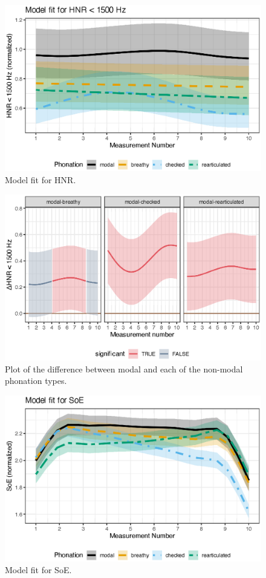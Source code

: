 \begin{figure}[h!]
    \centering
    \includegraphics[]{images/LCH_GAMMs/hnr15_model_fit.eps}
    \caption{Model fit for HNR.}
    \label{fig:hnr_model_fit}
\end{figure}    
\begin{figure}[h!]
    \centering
    \includegraphics[]{images/LCH_GAMMs/hnr15_model_diff.eps}
    \caption{Plot of the difference between modal and each of the non-modal phonation types.}
    \label{fig:hnr_model_diff}
\end{figure}

\begin{figure}[h!]
    \centering
    \includegraphics[]{images/LCH_GAMMs/soe_model_fit.eps}
    \caption{Model fit for SoE.}
    \label{fig:soe_model_fit}
\end{figure}

